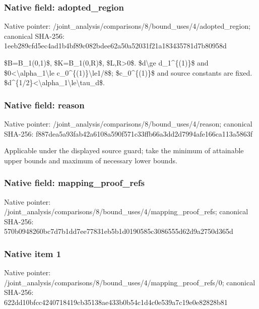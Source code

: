 \documentclass[10pt,a4paper]{article}
\begin{document}
\subsubsection{Native field: adopted\_region}


Native pointer: /joint\_analysis/comparis\allowbreak{}ons/8/bound\_uses/4/adopt\allowbreak{}ed\_region; canonical SHA-256: 1eeb289cfd5ec4ad1b4bf89c\allowbreak{}082bdee62a50a52031f21a18\allowbreak{}3435781d7b80958d


\$B=B\_1(0,1)\$, \$K=B\_1(0,R)\$, \$L,R>0\$. \$d\textbackslash{}ge d\_1\textasciicircum{}\{(1)\}\$ and \$0<\textbackslash{}alpha\_1\textbackslash{}le c\_0\textasciicircum{}\{(1)\}\textbackslash{}le1/8\$; \$c\_0\textasciicircum{}\{(1)\}\$ and source constants are fixed. \$d\textasciicircum{}\{1/2\}<\textbackslash{}alpha\_1\textbackslash{}le\textbackslash{}tau\_d\$.


\subsubsection{Native field: reason}


Native pointer: /joint\_analysis/comparis\allowbreak{}ons/8/bound\_uses/4/reaso\allowbreak{}n; canonical SHA-256: f887dea5a93fab42a6108a59\allowbreak{}0f571c33ffb66a3dd2d7994a\allowbreak{}fe166ca113a5863f


Applicable under the displayed source guard; take the minimum of attainable upper bounds and maximum of necessary lower bounds.


\subsubsection{Native field: mapping\_proof\_refs}


Native pointer: /joint\_analysis/comparis\allowbreak{}ons/8/bound\_uses/4/mappi\allowbreak{}ng\_proof\_refs; canonical SHA-256: 570b0948260bc7d7b1dd7ee7\allowbreak{}7831eb5b1d0190585c308655\allowbreak{}5d62d9a2750d365d



\subsubsection{Native item 1}


Native pointer: /joint\_analysis/comparis\allowbreak{}ons/8/bound\_uses/4/mappi\allowbreak{}ng\_proof\_refs/0; canonical SHA-256: 622dd10bfcc4240718419cb3\allowbreak{}5138ae433b0b54c1d4c0e539\allowbreak{}a7c19e0e82828b81
\end{document}
